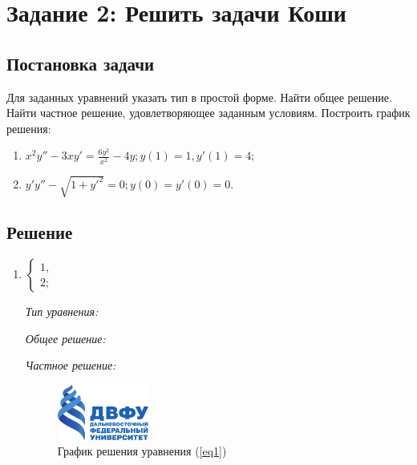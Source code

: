 \section{Задание 2: Решить задачи Коши}
    \subsection{Постановка задачи}
        Для заданных уравнений указать тип в простой форме. Найти общее решение. Найти частное решение, удовлетворяющее заданным условиям. Построить график решения:

        \begin{enumerate}
            \item \( x^2 y'' - 3xy' = \frac{6y^2}{x^2} - 4y; y(1) = 1, y'(1) = 4; \)
            \item \( y'y'' - \sqrt{1+y'^2} = 0; y(0) = y'(0) = 0. \)
        \end{enumerate}

    
    \subsection{Решение}
        \begin{enumerate}
            \item \( \begin{cases}
                1, \\
                2;
            \end{cases} \) \label{eq1}
            
                \textit{Тип уравнения:}

                
                \textit{Общее решение:}

                
                \textit{Частное решение:}

                \begin{figure}[H]
                    \centering
                    \includegraphics[width=3cm]{pictures/logo.pdf}
                    \caption{График решения уравнения (\ref{eq1})}
                \end{figure}
            

        \end{enumerate}